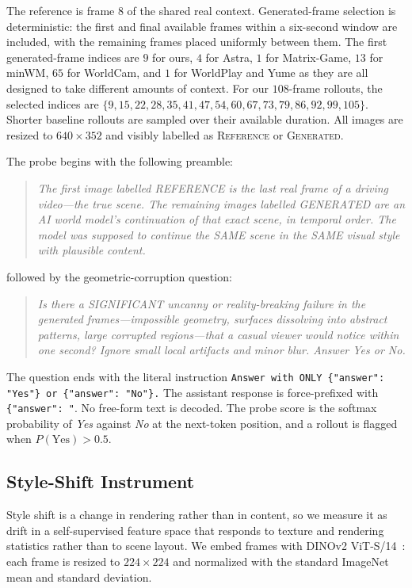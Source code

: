The reference is frame $8$ of the shared real context. Generated-frame
selection is deterministic: the first and final available frames within a
six-second window are included, with the remaining frames placed uniformly
between them. The first
generated-frame indices are $9$ for ours, $4$ for Astra, $1$ for Matrix-Game,
$13$ for minWM, $65$ for WorldCam, and $1$ for WorldPlay and Yume as they are all designed to take different amounts of context. For our
$108$-frame rollouts, the selected indices are
$\{9,15,22,28,35,41,47,54,60,67,73,79,86,92,99,105\}$. Shorter baseline
rollouts are sampled over their available duration. All images are resized to
$640\times352$ and visibly labelled as \textsc{Reference} or
\textsc{Generated}.

The probe begins with the following preamble:

\begin{quote}
\small
\emph{The first image labelled REFERENCE is the last real frame of a driving
video---the true scene. The remaining images labelled GENERATED are an AI
world model's continuation of that exact scene, in temporal order. The model
was supposed to continue the SAME scene in the SAME visual style with
plausible content.}
\end{quote}

followed by the geometric-corruption question:

\begin{quote}
\small
\emph{Is there a SIGNIFICANT uncanny or reality-breaking failure in the
generated frames---impossible geometry, surfaces dissolving into abstract
patterns, large corrupted regions---that a casual viewer would notice within
one second? Ignore small local artifacts and minor blur. Answer Yes or No.}
\end{quote}

The question ends with the literal instruction
\texttt{Answer with ONLY \{"answer": "Yes"\} or \{"answer": "No"\}.}
The assistant response is force-prefixed with
\verb|{"answer": "|. No free-form text is decoded. The probe score is the
softmax probability of \emph{Yes} against \emph{No} at the next-token
position, and a rollout is flagged when $P(\mathrm{Yes})>0.5$.

\subsection{Style-Shift Instrument}
\label{app:style_instrument}

Style shift is a change in rendering rather than in content, so we measure it as
drift in a self-supervised feature space that responds to texture and rendering
statistics rather than to scene layout. We embed frames with
DINOv2 ViT-S/14~\cite{dinov2}: each frame is resized to $224\times224$ and
normalized with the standard ImageNet mean and standard deviation.

